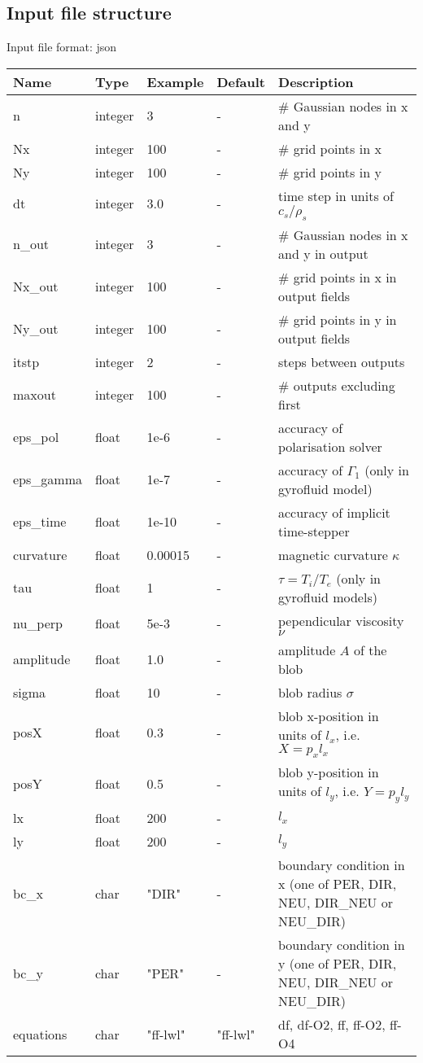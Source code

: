 \subsection{Input file structure}
Input file format: json

\begin{longtable}{llll>{\RaggedRight}p{7cm}}
\toprule
\rowcolor{gray!50}\textbf{Name} &  \textbf{Type} & \textbf{Example} & \textbf{Default} & \textbf{Description}  \\ \midrule
n      & integer & 3 & - &\# Gaussian nodes in x and y \\
Nx     & integer &100& - &\# grid points in x \\
Ny     & integer &100& - &\# grid points in y \\
dt     & integer &3.0& - &time step in units of $c_s/\rho_s$ \\
n\_out  & integer &3  & - &\# Gaussian nodes in x and y in output \\
Nx\_out & integer &100& - &\# grid points in x in output fields \\
Ny\_out & integer &100& - &\# grid points in y in output fields \\
itstp  & integer &2  & - &   steps between outputs \\
maxout & integer &100& - &      \# outputs excluding first \\
eps\_pol   & float &1e-6    & - &  accuracy of polarisation solver \\
eps\_gamma & float &1e-7    & - & accuracy of $\Gamma_1$ (only in gyrofluid model) \\
eps\_time  & float &1e-10   & - & accuracy of implicit time-stepper \\
curvature  & float &0.00015& - & magnetic curvature $\kappa$ \\
tau        & float &1      & - & $\tau = T_i/T_e$ (only in gyrofluid models) \\
nu\_perp    & float &5e-3   & - & pependicular viscosity $\nu$ \\
amplitude  & float &1.0    & - & amplitude $A$ of the blob \\
sigma      & float &10     & - & blob radius $\sigma$ \\
posX       & float &0.3    & - & blob x-position in units of $l_x$, i.e. $X = p_x l_x$\\
posY       & float &0.5    & - & blob y-position in units of $l_y$, i.e. $Y = p_y l_y$ \\
lx         & float &200    & - & $l_x$  \\
ly         & float &200    & - & $l_y$  \\
bc\_x   & char & "DIR"      & - & boundary condition in x (one of PER, DIR, NEU, DIR\_NEU or NEU\_DIR) \\
bc\_y   & char & "PER"      & - & boundary condition in y (one of PER, DIR, NEU, DIR\_NEU or NEU\_DIR) \\
equations  & char & "ff-lwl" & "ff-lwl" &df, df-O2, ff, ff-O2, ff-O4\\
\bottomrule
\end{longtable}

